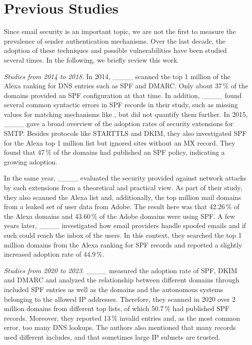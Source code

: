 \section{Previous Studies}
\label{sec:previous_work}
Since email security is an important topic, we are not the first to measure the prevalence of sender authentication mechanisms.
Over the last decade, the adoption of these techniques and possible vulnerabilities have been studied several times.
In the following, we briefly review this work.

\medskip
\emph{Studies from 2014 to 2018.}
In 2014, ____ scanned the top 1 million of the Alexa ranking for DNS entries such as SPF and DMARC.
Only about 37\,\% of the domains provided an SPF configuration at that time.
In addition, ____ found several common syntactic errors in SPF records in their study, such as missing values for matching mechanisms like , but did not quantify them further.
In 2015, ____ gave a broad overview of the adoption rates of security extensions for \ac{SMTP}.
Besides protocols like STARTTLS and \ac{DKIM}, they also investigated \ac{SPF} for the Alexa top 1 million list but ignored sites without an MX record.
They found that 47\,\% of the domains had published an SPF policy, indicating a growing adoption.

In the same year, ____ evaluated the security provided against network attacks by such extensions from a theoretical and practical view.
As part of their study, they also scanned the Alexa list and, additionally, the top million mail domains from a leaked set of user data from Adobe.
The result here was that 42.26\,\% of the Alexa domains and 43.60\,\% of the Adobe domains were using \ac{SPF}.
A few years later, ____ investigated how email providers handle spoofed emails and if such could reach the inbox of the users.
In this context, they searched the top 1 million domains from the Alexa ranking for \ac{SPF} records and reported a slightly increased adoption rate of 44.9\,\%. 

\medskip
\emph{Studies from 2020 to 2023.}
____ measured the adoption rate of SPF, DKIM and DMARC and analyzed the relationship between different domains through included SPF entries as well as the domains and the autonomous systems belonging to the allowed IP addresses.
Therefore, they scanned in 2020 over 2 million domains from different top lists, of which 50.7\,\% had published SPF records.
Moreover, they reported 13\,\% invalid entries and, as the most common error, too many DNS lookups. %
The authors also mentioned that many records used different includes, and that sometimes large IP subnets are trusted.

